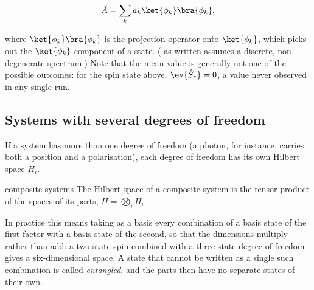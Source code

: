         \begin{equation}\label{eq:spectral}
            \hat{A} = \sum_{k}a_{k}\ket{\phi_{k}}\bra{\phi_{k}},
        \end{equation}

        where $\ket{\phi_{k}}\bra{\phi_{k}}$ is the projection operator onto $\ket{\phi_{k}}$, which picks out the $\ket{\phi_{k}}$ component of a state. ( as written assumes a discrete, non-degenerate spectrum.) Note that the mean value is generally not one of the possible outcomes: for the spin state above, $\ev{\hat{S}_{z}} = 0$, a value never observed in any single run.

    \subsection{Systems with several degrees of freedom}

        If a system has more than one degree of freedom (a photon, for instance, carries both a position and a polarisation), each degree of freedom has its own Hilbert space $H_{i}$.

        \begin{postulate}{composite systems}
            The Hilbert space of a composite system is the tensor product of the spaces of its parts, $H = \bigotimes_{i}H_{i}$.
        \end{postulate}

        In practice this means taking as a basis every combination of a basis state of the first factor with a basis state of the second, so that the dimensions multiply rather than add: a two-state spin combined with a three-state degree of freedom gives a six-dimensional space. A state that cannot be written as a single such combination is called \emph{entangled}, and the parts then have no separate states of their own.
